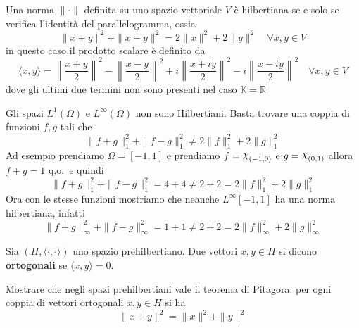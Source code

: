 \begin{proposition}
    Una norma \(\|\cdot \|\) definita su uno spazio vettoriale \(V\) è
    hilbertiana se e solo se verifica l'identità del parallelogramma, ossia
    \[
        \|x + y\|^2 + \|x - y\|^2 = 2\|x\|^2 + 2\|y\|^2 \quad \forall x, y \in V
    \]
    in questo caso il prodotto scalare è definito da
    \[
        \langle x,y \rangle = \left\|\frac{x+y}{2}\right\|^2 -
        \left\|\frac{x-y}{2}\right\|^2 + i
        \left\|\frac{x+iy}{2}\right\|^2 - i \left\|\frac{x-iy}{2}\right\|^2
        \quad \forall x, y \in V
    \]
    dove gli ultimi due termini non sono presenti nel caso \(\mathbb{K}=\mathbb{R}\) 
\end{proposition}

\begin{example}
    Gli spazi \(L^{1}{(\Omega)}\) e \(L^{\infty}{(\Omega)}\) non sono Hilbertiani. Basta trovare una
    coppia di funzioni \(f, g\) tali che 
    \[
        \|f + g\|_1^2 + \|f - g\|_1^2 \neq 2\|f\|_1^2 + 2\|g\|_1^2
    \]
    Ad esempio prendiamo \(\Omega = [-1,1]\) e prendiamo \(f = \rchi_{(-1, 0)}
    \) e \(g = \rchi_{{(0,1)}} \) allora \(f + g = 1\) q.o.~e quindi 
    \[
        \|f+g\|_1^2  + \|f-g\|_1^2 = 4 + 4 \neq 2 + 2 = 2\|f\|_1^2 + 2\|g\|_1^2
    \]
    Ora con le stesse funzioni mostriamo che neanche \(L^{\infty}{[-1, 1]}\) ha
    una norma hilbertiana, infatti
    \[
        \|f+g\|_{\infty}^2 + \|f-g\|_{\infty}^2 = 1 + 1 \neq 2 + 2 = 2\|f\|_{\infty}^2 + 2\|g\|_{\infty}^2
    \]
\end{example}

\begin{definition}[Ortogonalità]
    Sia \({(H, \langle \cdot ,\cdot  \rangle)}\) uno spazio prehilbertiano. Due
    vettori \(x, y \in H\) si dicono \textbf{ortogonali} se \(\langle x, y \rangle = 0\).
\end{definition}

\begin{eser}
    Mostrare che negli spazi prehilbertiani vale il teorema di Pitagora: 
    per ogni coppia di vettori ortogonali \(x, y \in H\) si ha
    \[
        \|x + y\|^2 = \|x\|^2 + \|y\|^2
    \]
\end{eser}

